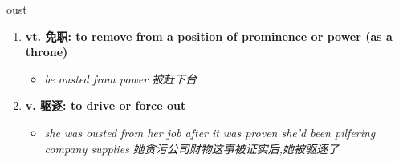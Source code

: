 
\begin{frame}
{\huge oust}
\begin{center}
\begin{enumerate}\Large
  \item \textbf{vt. 免职: to remove from a position of prominence or power (as a throne)}
  \begin{itemize}
    \item \em{\Large{be ousted from power 被赶下台}}
  \end{itemize}
  \item \textbf{v. 驱逐: to drive or force out}
  \begin{itemize}
    \item \em{\Large{she was ousted from her job after it was proven she'd been pilfering company supplies 她贪污公司财物这事被证实后,她被驱逐了}}
  \end{itemize}
\end{enumerate}
\end{center}
\end{frame}
